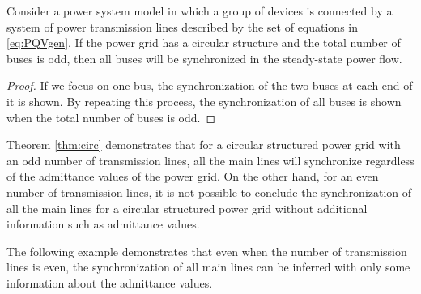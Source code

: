 \documentclass[graybox, envcountchap]{svmult}
\begin{document}
\begin{theorem}
\label{thm:circ}
Consider a power system model in which a group of devices is connected by a
system of power transmission lines described by the set of equations in
\ref{eq:PQVgen}. If the power grid has a circular structure and the total
number of buses is odd, then all buses will be synchronized in the steady-state
power flow.
\end{theorem}

\begin{proof}
If we focus on one bus, the synchronization of the two buses at each end of it
is shown. By repeating this process, the synchronization of all buses is shown
when the total number of buses is odd.
\end{proof}


Theorem \ref{thm:circ} demonstrates that for a circular structured power grid
with an odd number of transmission lines, all the main lines will synchronize
regardless of the admittance values of the power grid. On the other hand, for an
even number of transmission lines, it is not possible to conclude the
synchronization of all the main lines for a circular structured power grid
without additional information such as admittance values.

The following example demonstrates that even when the number of transmission
lines is even, the synchronization of all main lines can be inferred with only
some information about the admittance values.

\end{document}
